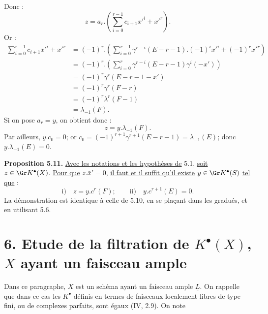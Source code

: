 
Donc :
\[
  z=a_r.\left(\sum_{i=0}^{r-1}c_{i+1}{x'}^i+{x'}^r\right).
\]
Or :
\[
\begin{aligned}
\sum_{i=0}^{r-1}c_{i+1}{x'}^i+{x'}^r
&=(-1)^r.\left(\sum_{i=0}^{r-1}\gamma^{r-i}(E-r-1).(-1)^i{x'}^i+(-1)^r{x'}^r\right)\\
&=(-1)^r.\left(\sum_{i=0}^{r}\gamma^{r-i}(E-r-1)\gamma^i(-x')\right)\\
&=(-1)^r\gamma^r(E-r-1-x')\\
&=(-1)^r\gamma^r(F-r)\\
&=(-1)^r\lambda^r(F-1)\\
&=\lambda_{-1}(F).
\end{aligned}
\]
Si on pose $a_r=y$, on obtient donc :
\[
  z=y.\lambda_{-1}(F).
\]
Par ailleurs, $y.c_0=0$; or $c_0=(-1)^{r+1}\gamma^{r+1}(E-r-1)=\lambda_{-1}(E)$; donc $y.\lambda_{-1}(E)=0$.

\textbf{Proposition 5.11.} \uline{Avec les notations et les hypothèses de} 5.1, \uline{soit} $z\in \Gr K^{\bullet}(X)$. \uline{Pour que} $z.\bar x'=0$, \uline{il faut et il suffit qu'il existe} $y\in \Gr K^{\bullet}(S)$ \uline{tel que} :
\[
  \text{i)}\quad z=y.c^r(F);
  \qquad
  \text{ii)}\quad y.c^{r+1}(E)=0.
\]
La démonstration est identique à celle de 5.10, en se plaçant dans les gradués, et en utilisant 5.6.


\section*{6. Etude de la filtration de \texorpdfstring{$K^{\bullet}(X)$}{K^{\bullet}(X)}, $X$ ayant un faisceau ample}

Dans ce paragraphe, $X$ est un schéma ayant un faisceau ample $\underline{L}$. On rappelle que dans ce cas les $K^{\bullet}$ définis en termes de faisceaux localement libres de type fini, ou de complexes parfaits, sont égaux (IV, 2.9). On note
